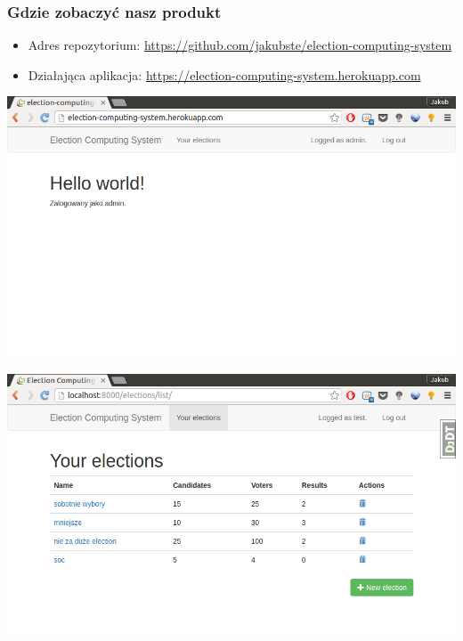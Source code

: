 \documentclass{beamer}
\begin{document}
\begin{frame}
\frametitle{Gdzie zobaczyć nasz produkt}

\begin{itemize}
\item Adres repozytorium: \linebreak
	\url{https://github.com/jakubste/election-computing-system}
\item Działająca aplikacja: 
	\url{https://election-computing-system.herokuapp.com}
\end{itemize}

\end{frame}


\begin{frame}
\hspace*{-1.1cm}
\includegraphics[width=\paperwidth]{screenshots/main_page}
\end{frame}

\begin{frame}
\hspace*{-1.1cm}
\includegraphics[width=\paperwidth]{screenshots/election_list}
\end{frame}
\end{document}

